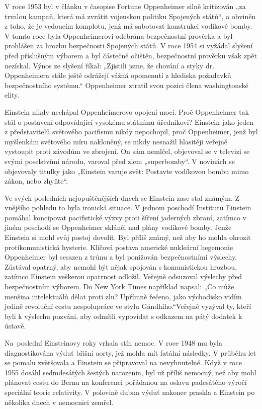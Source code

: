  V roce 1953 byl v článku v časopise Fortune Oppenheimer silně kritizován „za trvalou kampaň, která
  má zvrátit vojenskou politiku Spojených států“, a obviněn z toho, že je vedoucím komplotu, jenž má
  sabotovat konstrukci vodíkové bomby. V tomto roce byla Oppenheimerovi odebrána bezpečnostní
  prověrka a byl prohlášen za hrozbu bezpečnosti Spojených států. V roce 1954 si vyžádal slyšení
  před příslušným výborem a byl částečně očištěn, bezpečnostní prověrku však zpět nezískal. Výnos ze
  slyšení říkal: „Zjistili jsme, že chování a styky dr. Oppenheimera stále ještě odrážejí vážná
  opomenutí z hlediska požadavků bezpečnostního systému.“ Oppenheimer ztratil svou pozici člena
  washingtonské elity. 
  
  Einstein nikdy nechápal Oppenheimerovo opojení mocí. Proč Oppenheimer tak stál o postavení
  odpovídající vysokému státnímu úředníkovi? Einstein jako jeden z představitelů světového pacifismu
  nikdy nepochopil, proč Oppenheimer, jenž byl myšlenkám světového míru nakloněný, se nikdy nesnažil
  hlasitěji veřejně vystoupit proti závodům ve zbrojení. On sám nemlčel, objevoval se v televizi se
  svými poselstvími národu, varoval před zlem „superbomby“. V novinách se objevovaly titulky jako
  „Einstein varuje svět: Postavte vodíkovou bombu mimo zákon, nebo zhyňte“. 
  
  Ve svých posledních nejopuštěnějších dnech se Einstein zase stal známým. Z vnějšího pohledu to
  byla ironická situace. V jednom poschodí Institutu Einstein pomáhal koncipovat pacifistické výzvy
  proti šíření jaderných zbraní, zatímco v jiném poschodí se Oppenheimer skláněl nad plány vodíkové
  bomby. Jenže Einstein si mohl svůj postoj dovolit. Byl příliš známý, než aby ho mohla ohrozit
  protikomunistická hysterie. Klíčová postava americké nukleární hegemonie Oppenheimer byl sesazen z
  trůnu a byl ponižován bezpečnostními výslechy. Zůstával opatrný, aby nemohl být nějak spojován s
  komunistickou hrozbou, zatímco Einstein veškerou opatrnost odložil. Veřejně odsuzoval výslechy
  před bezpečnostním výborem. Do New York Times například napsal: „Co může menšina intelektuálů
  dělat proti zlu? Upřímně řečeno, jako východisko vidím jedině revoluční cestu nespolupráce ve
  stylu Gándhího.“Veřejně vyzýval ty, kteří byli k výslechu pozváni, aby odmítli vypovídat s odkazem
  na pátý dodatek k ústavě. 
  
  Na poslední Einsteinovy roky vrhala stín nemoc. V roce 1948 mu byla diagnostikována výduť břišní
  aorty, jež mohla mít fatální následky. V průběhu let se pomalu zvětšovala a Einstein se
  připravoval na nevyhnutelné. Když v roce 1955 dosáhl sedmdesátých šestých narozenin, byl už příliš
  nemocný, než aby mohl plánovat cestu do Bernu na konferenci pořádanou na oslavu padesátého výročí
  speciální teorie relativity. V polovině dubna výduť nakonec praskla a Einstein po několika dnech v
  nemocnici zemřel. 
  
